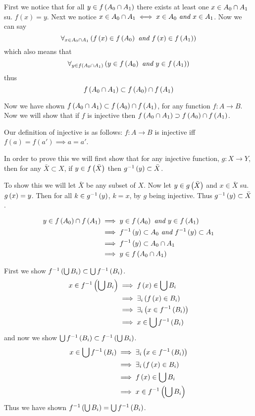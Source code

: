 \documentclass{article}
\begin{document}
First we notice that for all $y \in f \left( A_0 \cap A_1 \right)$ there exists at least one $x \in A_0 \cap A_1$ su. $f(x) = y$. Next we notice $x \in A_0 \cap A_1 \iff x \in A_0 \textit{ and } x \in A_1$. Now we can say \[\forall_{x\in A_0 \cap A_1}\left( f \left( x \right) \in f \left( A_0 \right) \textit{ and } f \left( x \right) \in f \left( A_1 \right) \right)\] which also means that \[\forall_{y\in f \left( A_0\cap A_1 \right)}\left( y \in f \left( A_0 \right) \textit{ and } y \in f \left( A_1 \right) \right)\] thus \[f \left( A_0\cap A_1 \right) \subset f \left( A_0 \right) \cap f \left( A_1 \right)\]

Now we have shown $f\left(A_0\cap A_1\right) \subset f\left(A_0\right) \cap f\left(A_1\right)$, for any function $f:A\to B$. Now we will show that if $f$ is injective then $f\left(A_0 \cap A_1\right) \supset f\left( A_0 \right) \cap f\left(A_1\right)$.



Our definition of injective is as follows: $f:A\to B$ is injective iff $f(a) = f(a') \implies a = a'$.

In order to prove this we will first show that for any injective function, $g:X\to Y$, then for any $\bar X \subset X$, if $y \in f \left( \bar X \right)$ then $g^{-1} \left( y \right) \subset \bar X$.

To show this we will let $\bar X$ be any subset of $X$. Now let $y \in g \left( \bar X \right)$ and $x\in\bar X$ su. $g \left( x \right) = y$. Then for all $k \in g^{-1} \left( y \right)$, $k=x$, by $g$ being injective. Thus $g^{-1} \left( y \right)\subset\bar X$.



\begin{align*}
y \in f \left( A_0 \right) \cap f \left( A_1 \right) &\implies y \in f \left( A_0 \right) \textit{ and } y \in f \left( A_1 \right) \\
&\implies f^{-1} \left( y \right) \subset A_0 \textit{ and } f^{-1} \left( y \right) \subset A_1 \\
&\implies f^{-1} \left( y \right) \subset A_0 \cap A_1 \\
&\implies y \in f \left( A_0 \cap A_1 \right)
\end{align*}

 First we show $f^{-1} \left( \bigcup B_i \right) \subset \bigcup f^{-1} \left( B_i \right)$.
\begin{align*}
x \in f^{-1} \left( \bigcup B_i \right) &\implies f \left( x \right) \in \bigcup B_i \\
&\implies \exists_{i}\left( {f \left( x \right) \in B_i} \right) \\
&\implies \exists_{i}\left( {x \in f^{-1} \left( B_i \right)} \right) \\
&\implies x \in \bigcup f^{-1} \left( B_i \right)
\end{align*}
and now we show $\bigcup f^{-1} \left( B_i \right)\subset f^{-1} \left( \bigcup B_i \right)$.
\begin{align*}
x\in\bigcup f^{-1} \left( B_i \right) &\implies \exists_{i}\left( {x\in f^{-1} \left( B_i \right)} \right) \\
&\implies \exists_{i}\left( {f \left( x \right)\in B_i} \right) \\
&\implies f \left( x \right) \in \bigcup B_i \\
&\implies x \in f^{-1} \left( \bigcup B_i \right)
\end{align*}
Thus we have shown $f^{-1} \left( \bigcup B_i \right) = \bigcup f^{-1} \left( B_i \right)$.
\end{document}
